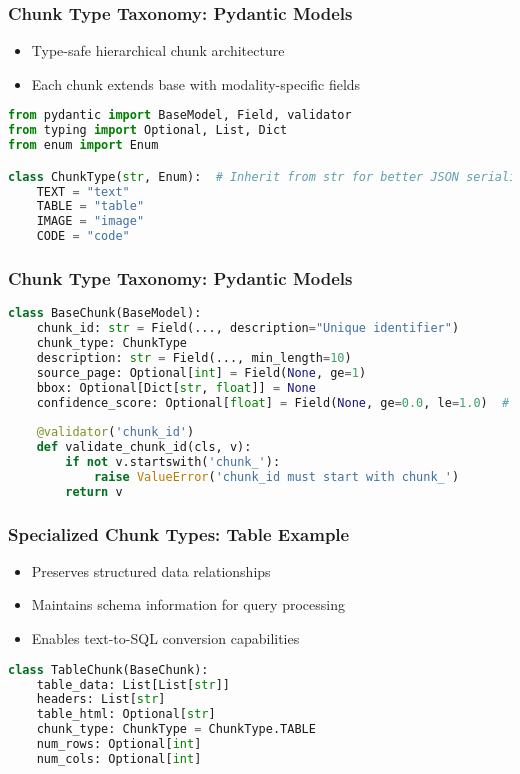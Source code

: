 \begin{frame}[fragile]\frametitle{Chunk Type Taxonomy: Pydantic Models}
\begin{itemize}
\item Type-safe hierarchical chunk architecture
\item Each chunk extends base with modality-specific fields
\end{itemize}

\begin{lstlisting}[language=Python, basicstyle=\tiny]
from pydantic import BaseModel, Field, validator
from typing import Optional, List, Dict
from enum import Enum

class ChunkType(str, Enum):  # Inherit from str for better JSON serialization
    TEXT = "text"
    TABLE = "table"
    IMAGE = "image"
    CODE = "code"

\end{lstlisting}

\end{frame}

\begin{frame}[fragile]\frametitle{Chunk Type Taxonomy: Pydantic Models}

\begin{lstlisting}[language=Python, basicstyle=\tiny]
class BaseChunk(BaseModel):
    chunk_id: str = Field(..., description="Unique identifier")
    chunk_type: ChunkType
    description: str = Field(..., min_length=10)
    source_page: Optional[int] = Field(None, ge=1)
    bbox: Optional[Dict[str, float]] = None
    confidence_score: Optional[float] = Field(None, ge=0.0, le=1.0)  # ADD THIS
    
    @validator('chunk_id')
    def validate_chunk_id(cls, v):
        if not v.startswith('chunk_'):
            raise ValueError('chunk_id must start with chunk_')
        return v
\end{lstlisting}

\end{frame}

\begin{frame}[fragile]\frametitle{Specialized Chunk Types: Table Example}

\begin{itemize}
\item Preserves structured data relationships
\item Maintains schema information for query processing
\item Enables text-to-SQL conversion capabilities
\end{itemize}

\begin{lstlisting}[language=Python, basicstyle=\tiny]
class TableChunk(BaseChunk):
    table_data: List[List[str]]
    headers: List[str]
    table_html: Optional[str]
    chunk_type: ChunkType = ChunkType.TABLE
    num_rows: Optional[int]
    num_cols: Optional[int]
\end{lstlisting}

\end{frame}

